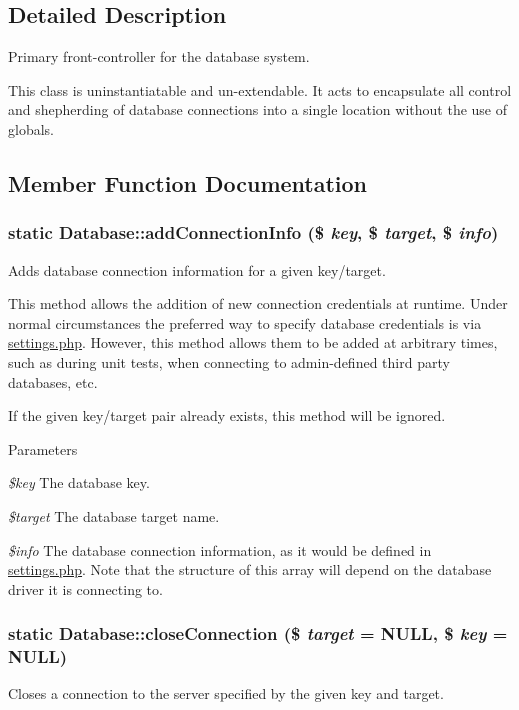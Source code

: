 \subsection{Detailed Description}
Primary front-\/controller for the database system.

This class is uninstantiatable and un-\/extendable. It acts to encapsulate all control and shepherding of database connections into a single location without the use of globals. 

\subsection{Member Function Documentation}
\hypertarget{classDatabase_a8b2462c18a8a4fea7c350e1123d3c6e7}{
\subsubsection[{addConnectionInfo}]{\setlength{\rightskip}{0pt plus 5cm}static Database::addConnectionInfo (\$ {\em key}, \/  \$ {\em target}, \/  \$ {\em info})}}
\label{classDatabase_a8b2462c18a8a4fea7c350e1123d3c6e7}
Adds database connection information for a given key/target.

This method allows the addition of new connection credentials at runtime. Under normal circumstances the preferred way to specify database credentials is via \hyperlink{settings_8php}{settings.php}. However, this method allows them to be added at arbitrary times, such as during unit tests, when connecting to admin-\/defined third party databases, etc.

If the given key/target pair already exists, this method will be ignored.


\begin{DoxyParams}{Parameters}
\item[{\em \$key}]The database key. \item[{\em \$target}]The database target name. \item[{\em \$info}]The database connection information, as it would be defined in \hyperlink{settings_8php}{settings.php}. Note that the structure of this array will depend on the database driver it is connecting to. \end{DoxyParams}
\hypertarget{classDatabase_a1e6a2484bc6ea4ac8ce820dd12baaa5b}{
\subsubsection[{closeConnection}]{\setlength{\rightskip}{0pt plus 5cm}static Database::closeConnection (\$ {\em target} = {\ttfamily NULL}, \/  \$ {\em key} = {\ttfamily NULL})}}
\label{classDatabase_a1e6a2484bc6ea4ac8ce820dd12baaa5b}
Closes a connection to the server specified by the given key and target.


